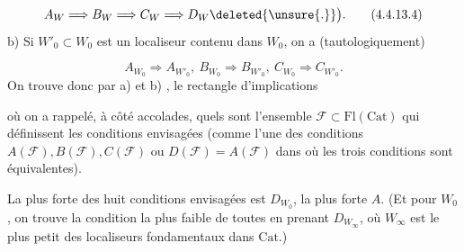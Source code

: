 \[
 A_W\Longrightarrow B_W\Longrightarrow C_W\Longrightarrow D_W\deleted{\unsure{.}}\big).\tag*{(4.4.13.4)}
\]
b) Si $W'_0\subset W_0$ est un localiseur  contenu dans $W_0$, on a (tautologiquement)

\[
 A_{W_0}\Rightarrow A_{W'_0},\ B_{W_0}\Rightarrow B_{W'_0},\ C_{W_0}\Rightarrow C_{W'_0}.
\]
On  trouve donc par a) et b) , le rectangle d'implications


où on a  rappelé, à côté  accolades, quels sont  l'ensemble $\mathcal F\subset\mathrm{Fl}(\mathrm{Cat})$ qui définissent les conditions envisagées  (comme l'une des conditions $A(\mathcal F), B(\mathcal F), C(\mathcal F)$ ou $D(\mathcal F)=A(\mathcal F)$ dans  où les trois conditions sont équivalentes).

La plus forte des huit conditions envisagées est $D_{W_0}$, la plus forte $A$.  (Et pour $W_0$ , on trouve la condition la plus faible de toutes en prenant $D_{W_\infty}$, où $W_\infty$ est le plus petit des localiseurs fondamentaux dans $\mathrm{Cat}$.)


